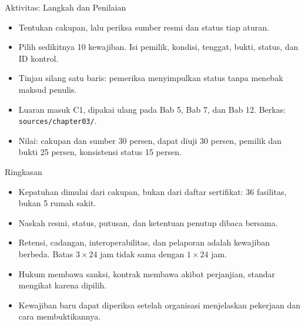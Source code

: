 \documentclass[aspectratio=169, table, 12pt]{beamer}
\begin{document}
\begin{frame}{{\Large Aktivitas: Langkah dan Penilaian}}
  \vspace{4pt}
  \small
  \begin{itemize}
    \item Tentukan cakupan, lalu periksa sumber resmi dan status tiap aturan.
    \item Pilih sedikitnya 10 kewajiban. Isi pemilik, kondisi, tenggat, bukti, status, dan ID kontrol.
    \item Tinjau silang satu baris: pemeriksa menyimpulkan status tanpa menebak maksud penulis.
    \item Luaran masuk C1, dipakai ulang pada Bab 5, Bab 7, dan Bab 12. Berkas: \texttt{sources/chapter03/}.
    \item Nilai: cakupan dan sumber 30 persen, dapat diuji 30 persen, pemilik dan bukti 25 persen,
          konsistensi status 15 persen.
  \end{itemize}
\end{frame}

\begin{frame}{{\Large Ringkasan}}
  \vspace{4pt}
  \small
  \begin{itemize}
    \item Kepatuhan dimulai dari cakupan, bukan dari daftar sertifikat: 36 fasilitas, bukan 5 rumah sakit.
    \item Naskah resmi, status, putusan, dan ketentuan penutup dibaca bersama.
    \item Retensi, cadangan, interoperabilitas, dan pelaporan adalah kewajiban berbeda. Batas $3 \times 24$ jam
          tidak sama dengan $1 \times 24$ jam.
    \item Hukum membawa sanksi, kontrak membawa akibat perjanjian, standar mengikat karena dipilih.
    \item Kewajiban baru dapat diperiksa setelah organisasi menjelaskan pekerjaan dan cara membuktikannya.
  \end{itemize}
\end{frame}
\end{document}
